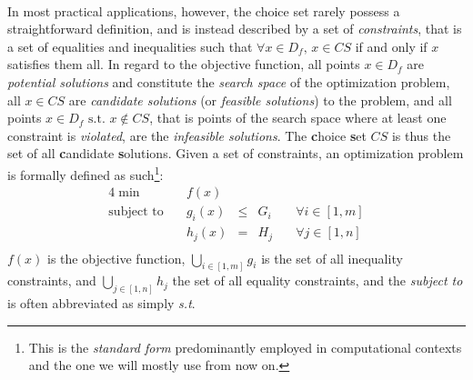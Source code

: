 	\paragraph{}
	In most practical applications, however, the choice set rarely possess a straightforward definition, and is instead described by a set of \emph{constraints}, that is a set of equalities and inequalities such that $\forall x\in D_f,\,x\in CS$ if and only if $x$ satisfies them all.
	In regard to the objective function, all points $x\in D_f$ are \emph{potential solutions} and constitute the \emph{search space} of the optimization problem, all $x\in CS$ are \emph{candidate solutions} (or \emph{feasible solutions}) to the problem, and all points $x\in D_f\text{ s.t. }x\notin CS$, that is points of the search space where at least one constraint is \emph{violated}, are the \emph{infeasible solutions}.
	The \textbf{c}hoice \textbf{s}et $CS$ is thus the set of all \textbf{c}andidate \textbf{s}olutions.
	Given a set of constraints, an optimization problem is formally defined as such\footnote{This is the \emph{standard form} predominantly employed in computational contexts and the one we will mostly use from now on.}:
	\begin{alignat*}{4}
		\min\quad& f(x) & & &\\
		\text{subject to}\quad& g_i(x) & \leq & G_i\quad & \forall i \in [1, m] \\
		                      & h_j(x) &   =  & H_j\quad & \forall j \in [1, n] \\
	\end{alignat*}
	$f(x)$ is the objective function, $\bigcup_{i \in [1,m]}{g_i}$ is the set of all inequality constraints, and $\bigcup_{j \in [1,n]}{h_j}$ the set of all equality constraints, and the \emph{subject to} is often abbreviated as simply \emph{s.t}.

